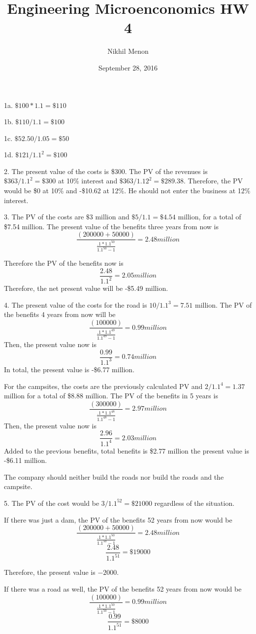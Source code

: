 \documentclass{article}
\title{Engineering Microenconomics HW 4}
\author{Nikhil Menon}
\date{September 28, 2016}
\begin{document}
\maketitle

1a. $\$100*1.1=\$110$

1b. $\$110/1.1=\$100$

1c. $\$52.50/1.05=\$50$

1d. $\$121/1.1^2=\$100$

2. The present value of the costs is \$300. The PV of the revenues is $\$363/1.1^2=\$300$ at 10\% interest and $\$363/1.12^2=\$289.38$. Therefore, the PV would be \$0 at 10\% and -\$10.62 at 12\%. He should not enter the business at 12\% interest.

3. The PV of the costs are $\$3$ million and $\$5/1.1=\$4.54$ million, for a total of \$7.54 million. The present value of the benefits three years from now is 
$$\frac{(200000+50000)}{\frac{.1*1.1^{50}}{1.1^{50}-1}}=2.48 million$$

Therefore the PV of the benefits now is
$$\frac{2.48}{1.1^2}=2.05 million$$
Therefore, the net present value will be -\$5.49 million.

4. The present value of the costs for the road is $10/1.1^3=7.51$ million. The PV of the benefits 4 years from now will be
$$\frac{(100000)}{\frac{.1*1.1^{49}}{1.1^{49}-1}}=0.99 million$$
Then, the present value now is
$$\frac{0.99}{1.1^3}=0.74million$$
In total, the present value is -\$6.77 million.

For the campsites, the costs are the previously calculated PV and $2/1.1^4=1.37$ million for a total of \$8.88 million.
The PV of the benefits in 5 years is
$$\frac{(300000)}{\frac{.1*1.1^{48}}{1.1^{48}-1}}=2.97 million$$
Then, the present value now is
$$\frac{2.96}{1.1^4}=2.03million$$
Added to the previous benefits, total benefits is \$2.77 million the present value is -\$6.11 million.

The company should neither build the roads nor build the roads and the campsite.

5. The PV of the cost would be $3/1.1^52=\$21000$ regardless of the situation. 

If there was just a dam, the PV of the benefits 52 years from now would be
$$\frac{(200000+50000)}{\frac{.1*1.1^{50}}{1.1^{50}-1}}=2.48 million$$
$$\frac{2.48}{1.1^{51}}=\$19000$$

Therefore, the present value is $-2000$.

If there was a road as well, the PV of the benefits 52 years from now would be 
$$\frac{(100000)}{\frac{.1*1.1^{50}}{1.1^{50}-1}}=0.99 million$$
$$\frac{0.99}{1.1^{51}}=\$8000$$
\end{document}
